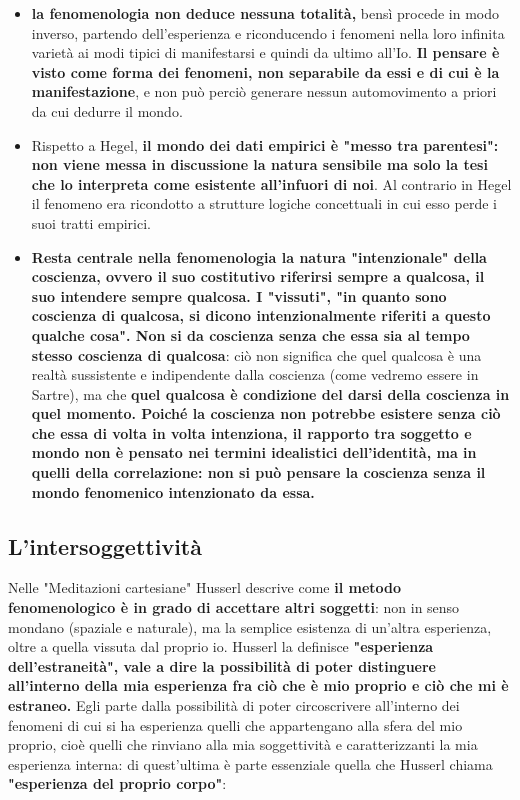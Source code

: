 \begin{itemize}


\item \textbf{la fenomenologia non deduce nessuna totalità,}
bensì procede in modo inverso, partendo dell'esperienza e riconducendo i fenomeni nella loro
infinita varietà ai modi tipici di manifestarsi
e quindi da ultimo all'Io. \textbf{Il pensare è
visto come forma dei fenomeni, non separabile
da essi e di cui è la manifestazione}, e non
può perciò generare nessun automovimento
a priori da cui dedurre il mondo.

\item  Rispetto a Hegel, \textbf{il mondo dei dati empirici
è "messo tra parentesi": non viene messa in
discussione la natura sensibile ma solo la tesi
che lo interpreta come esistente all'infuori
di noi}. Al contrario in Hegel il fenomeno
era ricondotto a strutture logiche concettuali
in cui esso perde i suoi tratti empirici.

\item  \textbf{Resta centrale nella fenomenologia la
natura "intenzionale" della coscienza, ovvero
il suo costitutivo riferirsi sempre a qualcosa,
il suo intendere sempre qualcosa. I "vissuti",
"in quanto sono coscienza di qualcosa, si
dicono intenzionalmente riferiti a questo
qualche cosa". Non si da coscienza senza
che essa sia al tempo stesso coscienza di
qualcosa}: ciò non significa che quel qualcosa
è una realtà sussistente e indipendente dalla
coscienza (come vedremo essere in Sartre), ma che \textbf{quel qualcosa è condizione del
darsi della coscienza in quel momento. Poiché la
coscienza non potrebbe esistere senza ciò che
essa di volta in volta intenziona, il rapporto
tra soggetto e mondo non è pensato nei termini
idealistici dell'identità, ma in quelli della
correlazione: non si può pensare la coscienza
senza il mondo fenomenico intenzionato da
essa.}

\end{itemize}

\subsection{L'intersoggettività}

Nelle "Meditazioni cartesiane" Husserl descrive come
\textbf{il metodo fenomenologico è in grado di accettare
altri soggetti}: non in senso mondano (spaziale e
naturale), ma la semplice esistenza di un'altra
esperienza, oltre a quella vissuta dal proprio io.
Husserl la definisce \textbf{"esperienza dell'estraneità",
vale a dire la possibilità di poter distinguere all'interno
della mia esperienza fra ciò che è mio proprio e ciò
che mi è estraneo.}
Egli parte dalla possibilità di poter circoscrivere
all'interno dei fenomeni di cui si ha esperienza quelli
che appartengano alla sfera del mio proprio, cioè
quelli che rinviano alla mia soggettività e
caratterizzanti la mia esperienza interna:
di quest'ultima è parte essenziale quella che
Husserl chiama \textbf{"esperienza del proprio corpo"}:

